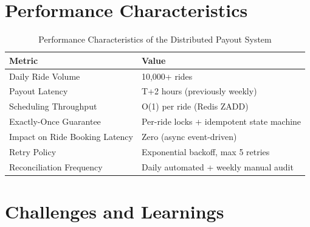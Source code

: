\documentclass[12pt,a4paper,oneside]{report}
\begin{document}
\section{Performance Characteristics}

\begin{table}[h]
\centering
\begin{tabular}{@{} l l @{}}
\toprule
\textbf{Metric} & \textbf{Value} \\
\midrule
Daily Ride Volume & 10,000+ rides \\
Payout Latency & T+2 hours (previously weekly) \\
Scheduling Throughput & O(1) per ride (Redis ZADD) \\
Exactly-Once Guarantee & Per-ride locks + idempotent state machine \\
Impact on Ride Booking Latency & Zero (async event-driven) \\
Retry Policy & Exponential backoff, max 5 retries \\
Reconciliation Frequency & Daily automated + weekly manual audit \\
\bottomrule
\end{tabular}
\caption{Performance Characteristics of the Distributed Payout System}
\label{tab:payout-performance}
\end{table}

\section{Challenges and Learnings}
\end{document}
